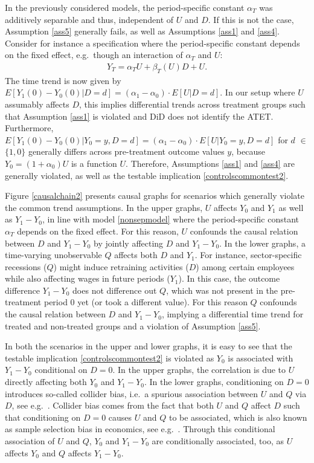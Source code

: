 {	
	In the previously considered models, the period-specific constant $\alpha_T$ was additively separable and thus, independent of $U$ and $D$. If this is not the case, Assumption \ref{ass5} generally fails, as well as Assumptions \ref{ass1} and \ref{ass4}. Consider for instance a specification where the period-specific constant depends on the fixed effect, e.g.\ though an interaction of $\alpha_T$ and $U$:
	\begin{eqnarray}\label{nonsepmodel}
		Y_T= \alpha_T U + \beta_T(U) D +  U.
	\end{eqnarray}
	The time trend is now given by $E[Y_1(0)-Y_0(0)|D=d]=(\alpha_1-\alpha_0)\cdot E[U|D=d]$. In our setup where $U$ assumably affects $D$, this implies differential trends across treatment groups such that Assumption \ref{ass1} is violated and DiD does not identify the ATET. Furthermore, $E[Y_1(0)-Y_0(0)|Y_0=y, D=d]=(\alpha_1-\alpha_0)\cdot E[U|Y_0=y, D=d]$ for $d$ $\in$ $\{1,0\}$ generally differs across pre-treatment outcome values $y$, because $Y_0=(1+\alpha_0)U$ is a function $U$. Therefore, Assumptions \ref{ass1} and \ref{ass4} are generally violated, as well as the testable implication \eqref{controlscommontest2}.
	
	Figure \ref{causalchain2} presents causal graphs for scenarios which generally violate the common trend assumptions. In the upper graphs, $U$ affects $Y_0$ and $Y_1$ as well as $Y_1-Y_0$, in line with model \ref{nonsepmodel} where the period-specific constant $\alpha_T$ depends on the fixed effect. For this reason, $U$ confounds the causal relation between $D$ and $Y_1-Y_0$ by jointly affecting $D$ and $Y_1-Y_0$. In the lower graphs, a time-varying unobservable $Q$ affects both $D$ and $Y_1$. For instance, sector-specific recessions ($Q$) might induce retraining activities ($D$) among certain employees while also affecting wages in future periods ($Y_1$). In this case, the outcome difference $Y_1-Y_0$ does not difference out $Q$, which was not present in the pre-treatment period 0 yet (or took a different value). For this reason $Q$ confounds the causal relation between $D$ and $Y_1-Y_0$, implying a differential time trend for treated and non-treated groups and a violation of Assumption \ref{ass5}.
	
	In both the scenarios in the upper and lower graphs, it is easy to see that the testable implication \eqref{controlscommontest2} is violated as $Y_0$ is associated with $Y_1-Y_0$ conditional on $D=0$. In the upper graphs, the correlation is due to $U$ directly affecting both $Y_0$ and $Y_1-Y_0$. In the lower graphs, conditioning on $D=0$ introduces so-called collider bias, i.e.\ a spurious association between $U$ and $Q$ via $D$, see e.g.\ \citet{Pearl00}. Collider bias comes from the fact that both $U$ and $Q$ affect $D$ such that conditioning on $D=0$ causes  $U$ and $Q$ to be associated, which is also known as sample selection bias in economics, see e.g.\ \citet{He76}. Through this conditional association of $U$ and $Q$, $Y_0$ and $Y_1-Y_0$ are conditionally associated, too, as $U$ affects $Y_0$ and $Q$ affects $Y_1-Y_0$. 
	
}
